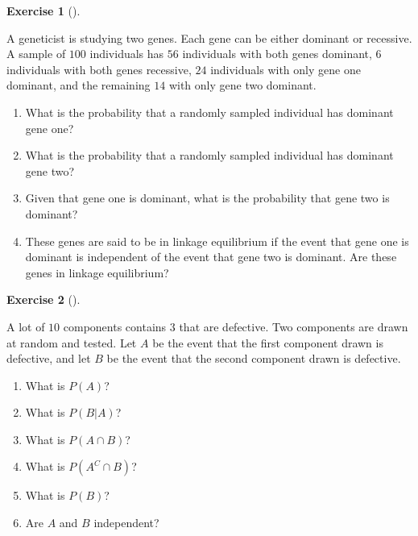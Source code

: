 \documentclass[
  letterpaper,
  DIV=11,
  numbers=noendperiod]{scrreprt}
\providecommand{\tightlist}{%
  \setlength{\itemsep}{0pt}\setlength{\parskip}{0pt}}\usepackage{longtable,booktabs,array}
\theoremstyle{definition}
\newtheorem{exercise}{Exercise}[chapter]
\theoremstyle{definition}
\theoremstyle{definition}
\theoremstyle{remark}
\begin{document}
\begin{exercise}[]\protect\hypertarget{exr-4.7}{}\label{exr-4.7}

A geneticist is studying two genes. Each gene can be either dominant or
recessive. A sample of \(100\) individuals has \(56\) individuals with
both genes dominant, \(6\) individuals with both genes recessive, \(24\)
individuals with only gene one dominant, and the remaining \(14\) with
only gene two dominant.

\begin{enumerate}
\def\labelenumi{\alph{enumi}.}
\tightlist
\item
  What is the probability that a randomly sampled individual has
  dominant gene one?
\item
  What is the probability that a randomly sampled individual has
  dominant gene two?
\item
  Given that gene one is dominant, what is the probability that gene two
  is dominant?
\item
  These genes are said to be in linkage equilibrium if the event that
  gene one is dominant is independent of the event that gene two is
  dominant. Are these genes in linkage equilibrium?
\end{enumerate}

\end{exercise}

\begin{exercise}[]\protect\hypertarget{exr-4.8}{}\label{exr-4.8}

A lot of \(10\) components contains \(3\) that are defective. Two
components are drawn at random and tested. Let \(A\) be the event that
the first component drawn is defective, and let \(B\) be the event that
the second component drawn is defective.

\begin{enumerate}
\def\labelenumi{\alph{enumi}.}
\tightlist
\item
  What is \(P(A)\)?
\item
  What is \(P(B|A)\)?
\item
  What is \(P(A \cap B)\)?
\item
  What is \(P(A^C \cap B)\)?
\item
  What is \(P(B)\)?
\item
  Are \(A\) and \(B\) independent?
\end{enumerate}

\end{exercise}
\end{document}
